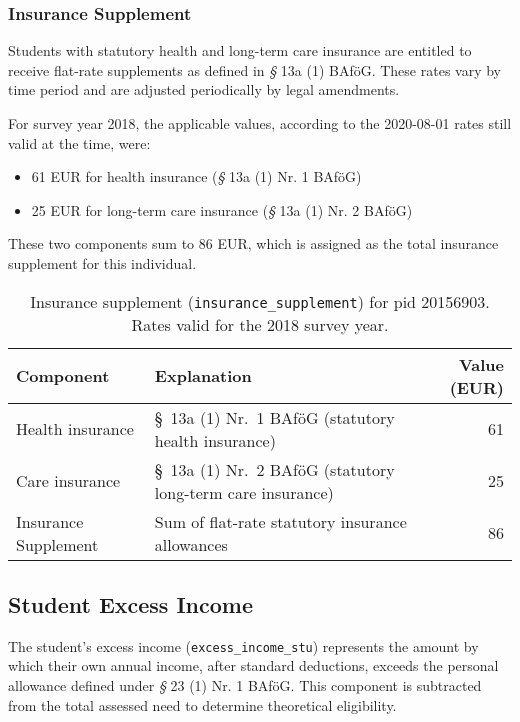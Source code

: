 \subsubsection{Insurance Supplement}
Students with statutory health and long-term care insurance are entitled to receive flat-rate supplements as defined in \textit{§} 13a (1) BAföG. 
These rates vary by time period and are adjusted periodically by legal amendments.

For survey year 2018, the applicable values, according to the 2020-08-01 rates still valid at the time, were:
\begin{itemize}
    \item 61 EUR for health insurance (\textit{§} 13a (1) Nr. 1 BAföG)
    \item 25 EUR for long-term care insurance (\textit{§} 13a (1) Nr. 2 BAföG)
\end{itemize}

These two components sum to 86 EUR, which is assigned as the total insurance supplement for this individual.

\begin{table}[H]
\footnotesize
\centering
\begin{tabularx}{\textwidth}{lXr}
\toprule
\textbf{Component} & \textbf{Explanation} & \textbf{Value (EUR)} \\
\midrule
\quad Health insurance & §~13a (1) Nr.~1 BAföG (statutory health insurance) & 61 \\
\quad Care insurance & §~13a (1) Nr.~2 BAföG (statutory long-term care insurance) & 25 \\
\midrule
Insurance Supplement & Sum of flat-rate statutory insurance allowances & 86 \\
\bottomrule
\end{tabularx}
\caption{Insurance supplement (\texttt{insurance\_supplement}) for pid 20156903. Rates valid for the 2018 survey year.}
\label{table:bafoeg_insurance}
\end{table}


\subsection{Student Excess Income}
The student’s excess income (\texttt{excess\_income\_stu}) represents the amount by which their own annual income, after standard deductions, exceeds the personal allowance defined under \textit{§} 23 (1) Nr. 1 BAföG. 
This component is subtracted from the total assessed need to determine theoretical eligibility.

